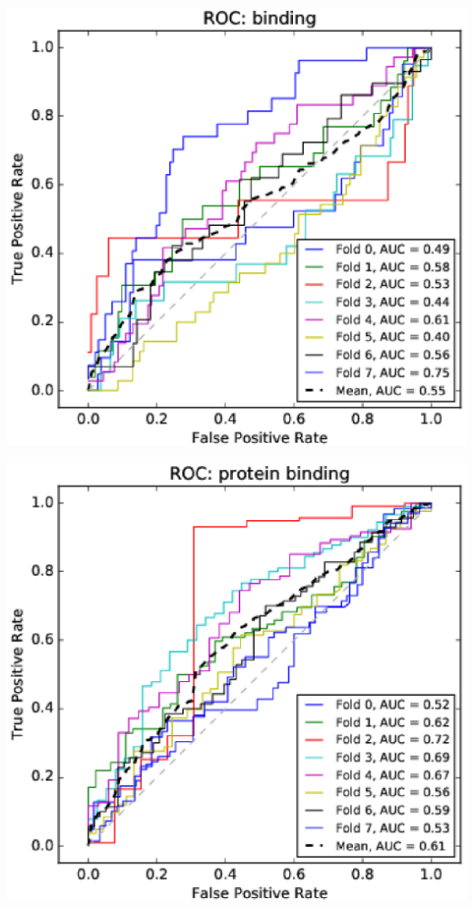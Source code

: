 \documentclass[11pt,twoside,a4paper]{book}
\newenvironment{Figure}
  {\par\medskip\noindent\minipage{\linewidth}}
  {\endminipage\par\medskip}
\begin{document}
\begin{multicols}{2}
\begin{Figure}\begin{center}\includegraphics[width=\linewidth]{figures/roc_binding}\label{fig:roc_binding}\end{center}\end{Figure}
\begin{Figure}\begin{center}\includegraphics[width=\linewidth]{figures/roc_protein_binding}\label{fig:roc_protein_binding}\end{center}\end{Figure}

\end{multicols}
\end{document}
